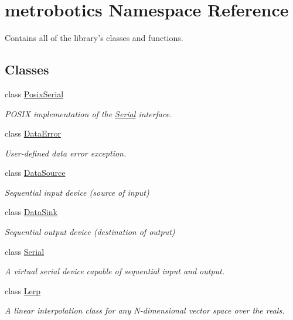 \hypertarget{namespacemetrobotics}{\section{metrobotics \-Namespace \-Reference}
\label{namespacemetrobotics}
}


\-Contains all of the library's classes and functions.  


\subsection*{\-Classes}
\begin{DoxyCompactItemize}
\item 
class \hyperlink{classmetrobotics_1_1PosixSerial}{\-Posix\-Serial}
\begin{DoxyCompactList}\small\item\em \-P\-O\-S\-I\-X implementation of the \hyperlink{classmetrobotics_1_1Serial}{\-Serial} interface. \end{DoxyCompactList}\item 
class \hyperlink{classmetrobotics_1_1DataError}{\-Data\-Error}
\begin{DoxyCompactList}\small\item\em \-User-\/defined data error exception. \end{DoxyCompactList}\item 
class \hyperlink{classmetrobotics_1_1DataSource}{\-Data\-Source}
\begin{DoxyCompactList}\small\item\em \-Sequential input device (source of input) \end{DoxyCompactList}\item 
class \hyperlink{classmetrobotics_1_1DataSink}{\-Data\-Sink}
\begin{DoxyCompactList}\small\item\em \-Sequential output device (destination of output) \end{DoxyCompactList}\item 
class \hyperlink{classmetrobotics_1_1Serial}{\-Serial}
\begin{DoxyCompactList}\small\item\em \-A virtual serial device capable of sequential input and output. \end{DoxyCompactList}\item 
class \hyperlink{classmetrobotics_1_1Lerp}{\-Lerp}
\begin{DoxyCompactList}\small\item\em \-A linear interpolation class for any \-N-\/dimensional vector space over the reals. \end{DoxyCompactList}\item 

\end{DoxyCompactItemize}
